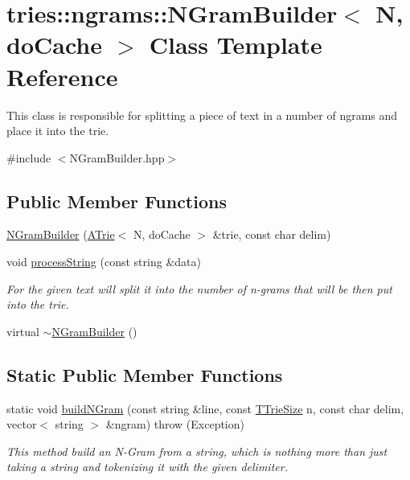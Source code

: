 \hypertarget{classtries_1_1ngrams_1_1_n_gram_builder}{}\section{tries\+:\+:ngrams\+:\+:N\+Gram\+Builder$<$ N, do\+Cache $>$ Class Template Reference}
\label{classtries_1_1ngrams_1_1_n_gram_builder}


This class is responsible for splitting a piece of text in a number of ngrams and place it into the trie.  




{\ttfamily \#include $<$N\+Gram\+Builder.\+hpp$>$}

\subsection*{Public Member Functions}
\begin{DoxyCompactItemize}
\item 
\hyperlink{classtries_1_1ngrams_1_1_n_gram_builder_a694f8a3a7e8fc07aefe5fba45ff4f31f}{N\+Gram\+Builder} (\hyperlink{classtries_1_1_a_trie}{A\+Trie}$<$ N, do\+Cache $>$ \&trie, const char delim)
\item 
void \hyperlink{classtries_1_1ngrams_1_1_n_gram_builder_a0301b1e6415228d4a81e858b40ad4a94}{process\+String} (const string \&data)
\begin{DoxyCompactList}\small\item\em For the given text will split it into the number of n-\/grams that will be then put into the trie. \end{DoxyCompactList}\item 
virtual \hyperlink{classtries_1_1ngrams_1_1_n_gram_builder_aa36389b96940e8a21771ad095b9d7a0b}{$\sim$\+N\+Gram\+Builder} ()
\end{DoxyCompactItemize}
\subsection*{Static Public Member Functions}
\begin{DoxyCompactItemize}
\item 
static void \hyperlink{classtries_1_1ngrams_1_1_n_gram_builder_a631371b5643e2222c2303b6163fdfd24}{build\+N\+Gram} (const string \&line, const \hyperlink{namespacetries_a621e8987880c3e13fa029a65336b920c}{T\+Trie\+Size} n, const char delim, vector$<$ string $>$ \&ngram)  throw (\+Exception)
\begin{DoxyCompactList}\small\item\em This method build an N-\/\+Gram from a string, which is nothing more than just taking a string and tokenizing it with the given delimiter. \end{DoxyCompactList}\end{DoxyCompactItemize}


